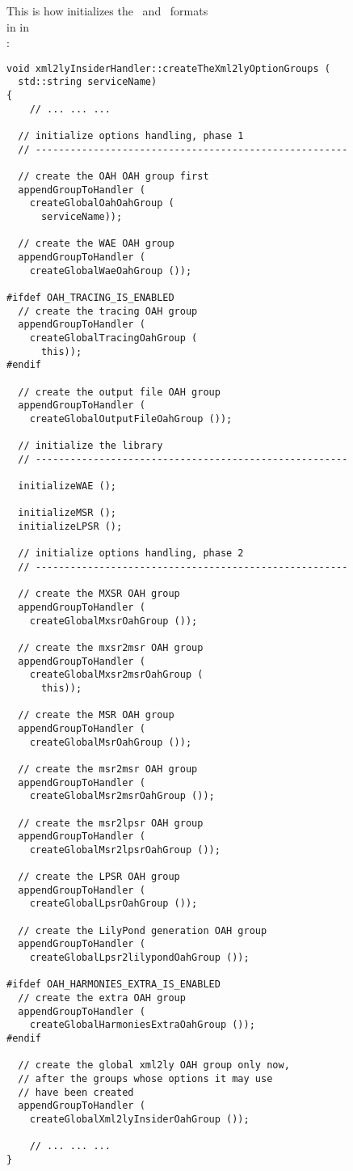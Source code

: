 This is how  initializes the \msrRepr\ and \lpsrRepr\ formats \\
in  in \\
:
\begin{lstlisting}[language=CPlusPlus]
void xml2lyInsiderHandler::createTheXml2lyOptionGroups (
  std::string serviceName)
{
	// ... ... ...

  // initialize options handling, phase 1
  // ------------------------------------------------------

  // create the OAH OAH group first
  appendGroupToHandler (
    createGlobalOahOahGroup (
      serviceName));

  // create the WAE OAH group
  appendGroupToHandler (
    createGlobalWaeOahGroup ());

#ifdef OAH_TRACING_IS_ENABLED
  // create the tracing OAH group
  appendGroupToHandler (
    createGlobalTracingOahGroup (
      this));
#endif

  // create the output file OAH group
  appendGroupToHandler (
    createGlobalOutputFileOahGroup ());

  // initialize the library
  // ------------------------------------------------------

  initializeWAE ();
  
  initializeMSR ();
  initializeLPSR ();

  // initialize options handling, phase 2
  // ------------------------------------------------------

  // create the MXSR OAH group
  appendGroupToHandler (
    createGlobalMxsrOahGroup ());

  // create the mxsr2msr OAH group
  appendGroupToHandler (
    createGlobalMxsr2msrOahGroup (
      this));

  // create the MSR OAH group
  appendGroupToHandler (
    createGlobalMsrOahGroup ());

  // create the msr2msr OAH group
  appendGroupToHandler (
    createGlobalMsr2msrOahGroup ());

  // create the msr2lpsr OAH group
  appendGroupToHandler (
    createGlobalMsr2lpsrOahGroup ());

  // create the LPSR OAH group
  appendGroupToHandler (
    createGlobalLpsrOahGroup ());

  // create the LilyPond generation OAH group
  appendGroupToHandler (
    createGlobalLpsr2lilypondOahGroup ());

#ifdef OAH_HARMONIES_EXTRA_IS_ENABLED
  // create the extra OAH group
  appendGroupToHandler (
    createGlobalHarmoniesExtraOahGroup ());
#endif

  // create the global xml2ly OAH group only now,
  // after the groups whose options it may use
  // have been created
  appendGroupToHandler (
    createGlobalXml2lyInsiderOahGroup ());

	// ... ... ...
}
\end{lstlisting}

